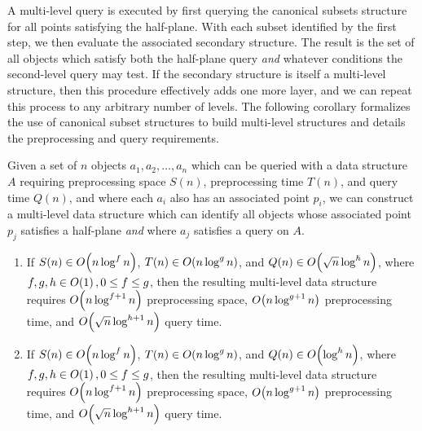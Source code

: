 A multi-level query is executed by first querying the canonical subsets structure for all points satisfying the half-plane.
With each subset identified by the first step, we then evaluate the associated secondary structure.
The result is the set of all objects which satisfy both the half-plane query \emph{and} whatever conditions the second-level query may test.
If the secondary structure is itself a multi-level structure, then this procedure effectively adds one more layer, and we can repeat this process to any arbitrary number of levels.
The following corollary formalizes the use of canonical subset structures to build multi-level structures and details the preprocessing and query requirements.


\begin{corollary}
\label{cor:multichan}

Given a set of $n$ objects $a_1, a_2, \ldots, a_n$ which can be queried with a data structure $A$ requiring preprocessing space $S(n)$, preprocessing time $T(n)$, and query time $Q(n)$, and where each $a_i$ also has an associated point $p_i$, we can construct a multi-level data structure which can identify all objects whose associated point $p_j$ satisfies a half-plane  \emph{and} where $a_j$ satisfies a query on $A$.

\begin{enumerate}
\item If $S(n) \in O\!\left(n \log^f{n}\right)$, $T(n) \in O\!\left(n \log^g{n}\right)$, and $Q(n) \in O\!\left(\sqrt{n} \log^h{n}\right)$, where $f, g, h \in O\!\left(1\right), 0 \leq f \leq g$, then the resulting multi-level data structure requires $O\!\left(n\log^{f+1}{n}\right)$ preprocessing space, $O\!\left(n\log^{g+1}{n}\right)$ preprocessing time, and $O\!\left(\sqrt{n}\log^{h+1}{n}\right)$ query time.

\item If $S(n) \in O\!\left(n \log^f{n}\right)$, $T(n) \in O\!\left(n \log^g{n}\right)$, and $Q(n) \in O\!\left(\log^h{n}\right)$, where $f, g, h \in O\!\left(1\right), 0 \leq f \leq g$, then the resulting multi-level data structure requires $O\!\left(n\log^{f+1}{n}\right)$ preprocessing space, $O\!\left(n\log^{g+1}{n}\right)$ preprocessing time, and $O\!\left(\sqrt{n}\log^{h+1}{n}\right)$ query time.

\end{enumerate}
\end{corollary}

